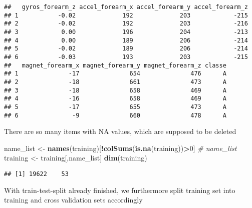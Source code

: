 \documentclass[
]{article}
\newenvironment{Shaded}{\begin{snugshade}}{\end{snugshade}}
\newcommand{\CommentTok}[1]{\textcolor[rgb]{0.56,0.35,0.01}{\textit{#1}}}
\newcommand{\DataTypeTok}[1]{\textcolor[rgb]{0.13,0.29,0.53}{#1}}
\newcommand{\DecValTok}[1]{\textcolor[rgb]{0.00,0.00,0.81}{#1}}
\newcommand{\FloatTok}[1]{\textcolor[rgb]{0.00,0.00,0.81}{#1}}
\newcommand{\KeywordTok}[1]{\textcolor[rgb]{0.13,0.29,0.53}{\textbf{#1}}}
\newcommand{\NormalTok}[1]{#1}
\newcommand{\OperatorTok}[1]{\textcolor[rgb]{0.81,0.36,0.00}{\textbf{#1}}}
\newcommand{\OtherTok}[1]{\textcolor[rgb]{0.56,0.35,0.01}{#1}}
\newcommand{\StringTok}[1]{\textcolor[rgb]{0.31,0.60,0.02}{#1}}
\begin{document}
\begin{verbatim}
##   gyros_forearm_z accel_forearm_x accel_forearm_y accel_forearm_z
## 1           -0.02             192             203            -215
## 2           -0.02             192             203            -216
## 3            0.00             196             204            -213
## 4            0.00             189             206            -214
## 5           -0.02             189             206            -214
## 6           -0.03             193             203            -215
##   magnet_forearm_x magnet_forearm_y magnet_forearm_z classe
## 1              -17              654              476      A
## 2              -18              661              473      A
## 3              -18              658              469      A
## 4              -16              658              469      A
## 5              -17              655              473      A
## 6               -9              660              478      A
\end{verbatim}

There are so many items with NA values, which are supposed to be deleted

\begin{Shaded}
\begin{Highlighting}[]
\NormalTok{name_list <-}\StringTok{ }\KeywordTok{names}\NormalTok{(training)[}\OperatorTok{!}\KeywordTok{colSums}\NormalTok{(}\KeywordTok{is.na}\NormalTok{(training))}\OperatorTok{>}\DecValTok{0}\NormalTok{]}
\CommentTok{# name_list}
\NormalTok{training <-}\StringTok{ }\NormalTok{training[,name_list]}
\KeywordTok{dim}\NormalTok{(training)}
\end{Highlighting}
\end{Shaded}

\begin{verbatim}
## [1] 19622    53
\end{verbatim}

With train-test-split already finished, we furthermore split training
set into training and cross validation sets accordingly

\begin{Shaded}
\end{Shaded}
\end{document}
